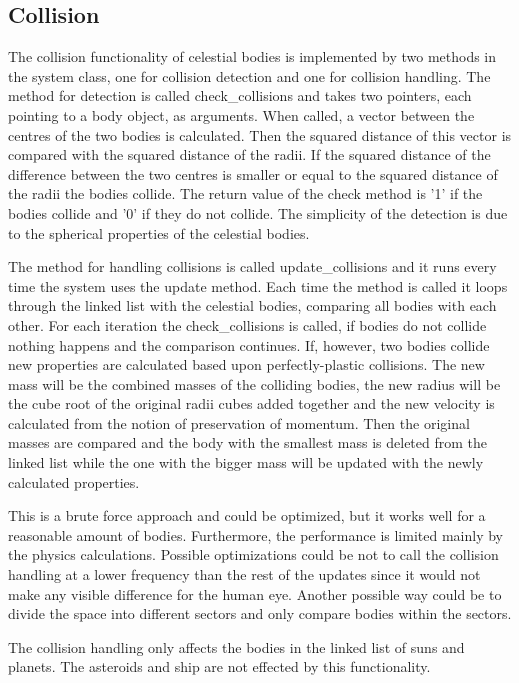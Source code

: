 \documentclass[a4paper,12pt]{article} \usepackage{graphicx}
\begin{document}
\subsection{Collision}
The collision functionality of celestial bodies is implemented by two methods in
the system class, one for collision detection and one for collision handling.
The method for detection is called check\_collisions and takes two pointers,
each pointing to a body object, as arguments. When called, a vector between the centres of the two
bodies is calculated. Then the squared distance of this vector is compared with
the squared distance of the radii. If the squared distance of the difference
between the two centres is smaller or equal to the squared distance of the radii
the bodies collide. The return value of the check method is '1' if the bodies
collide and '0' if they do not collide. The simplicity of the detection is due
to the spherical properties of the celestial bodies.

The method for handling collisions is called update\_collisions and it runs
every time the system uses the update method. Each time the method is called it loops
through the linked list with the celestial bodies, comparing all bodies with
each other. For each iteration the check\_collisions is called, if bodies do not
collide nothing happens and the comparison continues. If, however, two bodies
collide new properties are calculated based upon perfectly-plastic collisions. 
The new mass will be the combined masses of the colliding bodies, the new radius
will be the cube root of the original radii cubes added together and the new
velocity is calculated from the notion of preservation of momentum. Then the
original masses are compared and the body with the smallest mass is deleted from
the linked list while the one with the bigger mass will be updated with the
newly calculated properties.

This is a brute force approach and could be optimized, but it works well for a
reasonable amount of bodies. Furthermore, the performance is limited mainly by the
physics calculations. Possible optimizations could be not to call the collision
handling at a lower frequency than the rest of the updates since it would not
make any visible difference for the human eye. Another possible way could be to
divide the space into different sectors and only compare bodies within the
sectors. 

The collision handling only affects the bodies in the linked list of suns and
planets. The asteroids and ship are not effected by this functionality.
\end{document}
